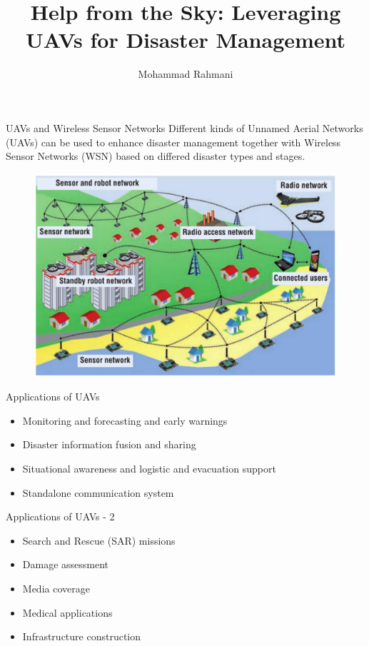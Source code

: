 \documentclass[unknownkeysallowed]{beamer}
\title{Help from the Sky: Leveraging UAVs for Disaster Management}
\author{Mohammad Rahmani}
\institute{Pervasive Computing Group}
\begin{document}
\begin{frame}
	\maketitle
\end{frame}

\begin{frame}{UAVs and Wireless Sensor Networks}
	Different kinds of Unnamed Aerial Networks (UAVs) can be used to enhance disaster management together with Wireless Sensor Networks (WSN) based on differed disaster types and stages. 
	\begin{figure}
		\includegraphics[scale=0.45]{uav-wsn.jpg}
	\end{figure}
\end{frame}

\begin{frame}{Applications of UAVs}
	\begin{itemize}
		\item Monitoring and forecasting and early warnings
		\item Disaster information fusion and sharing
		\item Situational awareness and logistic and evacuation support
		\item Standalone communication system
	\end{itemize}
\end{frame}

\begin{frame}{Applications of UAVs - 2}
	\begin{itemize}
		\item Search and Rescue (SAR) missions
		\item Damage assessment
		\item Media coverage
		\item Medical applications
		\item Infrastructure construction
	\end{itemize}
\end{frame}
\end{document}
